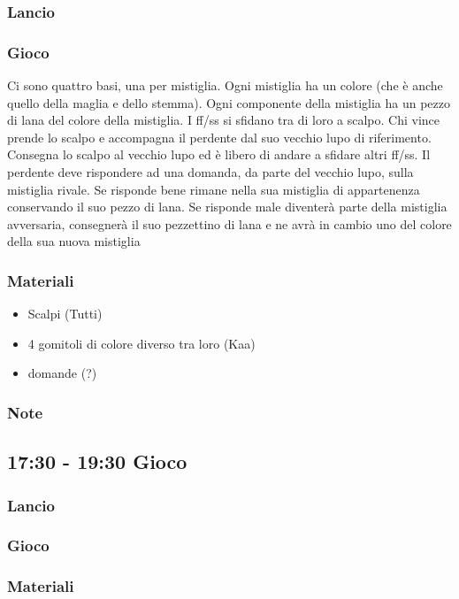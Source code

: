 \documentclass[../main.tex]{subfiles}
\begin{document}
       \subsubsection{Lancio}
       \subsubsection{Gioco}
       Ci sono quattro basi, una per mistiglia. Ogni mistiglia ha un colore (che è anche quello della maglia e dello stemma). Ogni componente della mistiglia ha un pezzo di lana del colore della mistiglia. I ff/ss si sfidano tra di loro a scalpo. Chi vince prende lo scalpo e accompagna il perdente dal suo vecchio lupo di riferimento. Consegna lo scalpo al vecchio lupo ed è libero di andare a sfidare altri ff/ss. Il perdente deve rispondere ad una domanda, da parte del vecchio lupo, sulla mistiglia rivale. Se risponde bene rimane nella sua mistiglia di appartenenza conservando il suo pezzo di lana. Se risponde male diventerà parte della mistiglia avversaria, consegnerà il suo pezzettino di lana e ne avrà in cambio uno del colore della sua nuova mistiglia
       \subsubsection{Materiali}
       \begin{itemize}
           \item Scalpi (Tutti)
           \item 4 gomitoli di colore diverso tra loro (Kaa)
           \item domande (?)
       \end{itemize}
       \subsubsection{Note}
       
    \subsection{17:30 - 19:30 Gioco}
        \subsubsection{Lancio}
        \subsubsection{Gioco}
        \subsubsection{Materiali}
\end{document}
